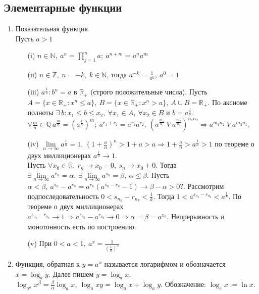 \documentclass[a4paper, 12pt]{article}
\newcommand{\Z}{\mathbb{Z}}
\newcommand{\N}{\mathbb{N}}
\newcommand{\R}{\mathbb{R}}
\newcommand{\Q}{\mathbb{Q}}
\theoremstyle{definition}
\begin{document}
        \subsection{Элементарные функции}
        \begin{enumerate}
            \item Показательная функция\\
            Пусть $a>1$
            \begin{itemize}
                \item[(i)] $n\in \N,\ a^n=\prod\limits_{j=1}^n a;\ a^{n+m}=a^n a^m$
                \item[(ii)] $n\in \Z,\ n=-k,\ k\in \N$, тогда $a^{-k}=\frac{1}{a^k},\ a^0=1$
                \item[(iii)] $a^\frac{1}{n}: b^n=a$ в $\R_{+}$ (строго положительные числа). Пусть $A=\{x\in \R_{+}: x^n\leq a\},\ B=\{x\in \R_{+}: x^n>a\},\ A\cup B=\R_{+}$. По аксиоме полноты $\exists\ b: x_1\leq b\leq x_2,\ \forall x_1\in A,\ \forall x_2\in B$ и $b=a^{\frac{1}{n}}$. $\forall \frac{m}{n}\in \Q\ a^{\frac{m}{n}}=(a^{\frac{1}{n}})^m;\ a^{r_1+r_2}=a^{r_1}a^{r_2},\ (a^{\frac{m_1}{n_1}}\ V\ a^{\frac{m_2}{n_2}})^{n_1 n_2}\Rightarrow a^{m_1 n_2}\ V\ a^{m_2 n_1}$.
                \item[(iv)] $\lim\limits_{n\to \infty} a^{\frac{1}{n}}=1$. $(1+\frac{a}{n})^n>1+a>a \Rightarrow 1+\frac{a}{n}>a^{\frac{1}{n}}>1$ по теореме о двух миллиционерах $a^{\frac{1}{n}}\to 1$.\\
                Пусть $\forall x_0\in \R,\ r_n\to x_0-0,\ s_n\to x_0+0$. Тогда $\exists \lim\limits_{n\to\infty}a^{r_n}=\alpha,\ \exists \lim\limits_{n\to \infty}a^{s_n}=\beta,\ \alpha\leq \beta$. Пусть $\alpha < \beta,\ a^{s_n}-a^{r_n}=a^{r_n}(a^{s_n-r_n}-1)\to \beta-\alpha>0?$. Рассмотрим подпоследовательность $0<s_{n_k}-r_{n_k}<\frac{1}{k}$. Тогда $1<a^{s_{n_k}-r_{n_k}}<a^{\frac{1}{k}}$. По теореме о двух миллиционерах $a^{s_{n_k}-r_{n_k}}\to 1 \Rightarrow a^{s_{n_k}}-a^{r_{n_k}}\to 0 \Rightarrow \alpha=\beta=a^{x_0}$. Непрерывность и монотонность есть по построению.
                \item[(v)] При $0<a<1,\ a^x=\frac{1}{(\frac{1}{a})^x}$
            \end{itemize}
            \item Функция, обратная к $y=a^x$ называется логарифмом и обозначается $x=\log_a{y}$. Далее пишем $y=\log_a{x}$.\\
            $\log_{a^{\alpha}}{x^{\beta}}=\frac{\beta}{\alpha}\log_a{x},\ \log_a{xy}=\log_a{x}+\log_a{y}$. Обозначение: $\log_e{x}:=\ln{x}$.

\end{enumerate}
\end{document}
